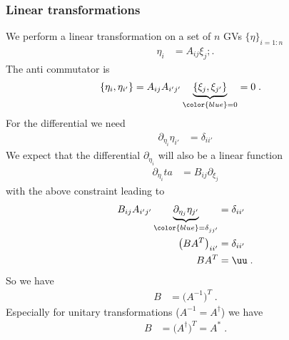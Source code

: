 \subsubsection{Linear transformations}

We perform a linear transformation on a set of $n$ GVs $\{\eta\}_{i=1:n}$
%
\begin{align}
\eta_{i} &= A_{ij} \xi_{j};.
\end{align}
%
The anti commutator is
%
\begin{align*}
\{\eta_{i},\eta_{i'}\} &=A_{ij} A_{i'j'} \underbrace{
\{ \xi_{j},\xi_{j'}\} 
}_{\color{blue} = 0} = 0\;.
\end{align*}
%
For the differential  we need 
%
\begin{align*}
\partial_{\eta_{i}} \eta_{i'} &= \delta_{ii'}
\end{align*}
%
We expect that the differential $\partial_{\eta_{i}}$ will also be a linear function 
%
\begin{align*}
\partial_{\eta_{i}}ta &= B_{ij} \partial_{\xi_{j}}
\end{align*}
%
with the above constraint leading to
%
\begin{align*}
B_{ij}  A_{i'j'} 
\underbrace{
\partial_{\eta_{j}} \eta_{j'} 
}_{\color{blue} = \delta_{jj'}}
&= \delta_{ii'}\\
\big(B  A^{T} \big)_{ii'} &=  \delta_{ii'}\\
B A^{T} &= \uu\;.
\end{align*}
So we have
%
\begin{align}\label{eq:B:A}
B &= \big(A^{-1}\big)^{T}\;.
\end{align}
%
Especially for unitary transformations ($A^{-1}=A^{\dagger}$) we have
%
\begin{align*}
B &= \big(A^{\dagger}\big)^{T} = A^{*}\;.
\end{align*}
%

